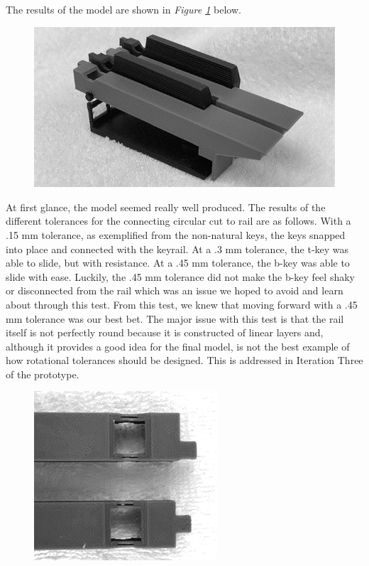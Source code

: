 The results of the model are shown in \textit{Figure \ref{fig:print1}} below.

\begin{figure}[h!]
  \centering
  \includegraphics[width=0.8\linewidth]{image/Print1.png}
  \caption{}
  \label{fig:print1}
\end{figure}

At first glance, the model seemed really well produced. The results of the different tolerances for the connecting circular cut to rail are as follows. With a .15 mm tolerance, as exemplified from the non-natural keys, the keys snapped into place and connected with the keyrail. At a .3 mm tolerance, the t-key was able to slide, but with resistance. At a .45 mm tolerance, the b-key was able to slide with ease. Luckily, the .45 mm tolerance did not make the b-key feel shaky or disconnected from the rail which was an issue we hoped to avoid and learn about through this test. From this test, we knew that moving forward with a .45 mm tolerance was our best bet. The major issue with this test is that the rail itself is not perfectly round because it is constructed of linear layers and, although it provides a good idea for the final model, is not the best example of how rotational tolerances should be designed. This is addressed in Iteration Three of the prototype.

\begin{figure}[h!]
  \centering
  \includegraphics[width=0.6\linewidth]{image/Print2.png}
  \caption{}
  \label{fig:print2}
\end{figure}

